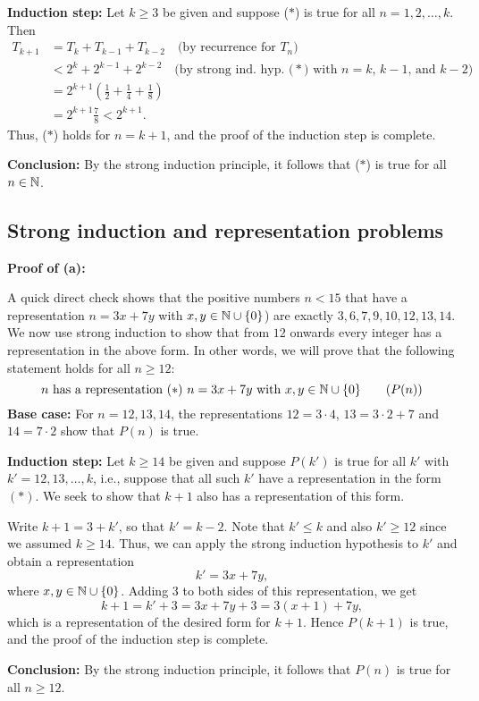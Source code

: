 \textbf{Induction step:} Let $k\ge3$ be given and suppose 
($*$) is true for all $n=1,2,\dots,k$. Then
\begin{align*}
T_{k+1}&=T_{k}+T_{k-1}+T_{k-2}
\quad \text{(by recurrence for $T_n$)}
\\
&<2^{k}+2^{k-1}+2^{k-2} \quad \text{(by strong ind. hyp. ($*$)
with $n=k$, $k-1$, and $k-2$)}
\\
&=2^{k+1}\left(\frac12+\frac14+\frac18\right)
\\
&=2^{k+1}\frac{7}{8}
<2^{k+1}.
\end{align*}
Thus, ($*$) holds for $n=k+1$, and the proof of the induction step is complete. 

\textbf{Conclusion:} By the strong induction principle,  it follows that
($*$) is true for all $n\in\mathbb{N}$.  

\subsection{Strong induction and representation problems}

\textbf{Proof of (a):}

A quick direct check shows that the 
positive numbers $n<15$ that have a
representation $n=3x+7y$ with $x,y\in\mathbb{N}\cup \{0\}$) are exactly
$3,6,7,9,10,12,13,14$.  We now use strong induction to show that from
$12$ onwards every integer has a representation in the above form.
In other words, we will prove that the following 
statement holds for all $n\ge12$:
\[
\text{$n$ has a representation $(*)$ $n=3x+7y$ with $x,y\in\mathbb{N}\cup \{0\}$}
\tag{$P(n)$}
\]
\textbf{Base case:} For $n=12,13,14$, the representations $12=3\cdot 4$,
$13=3\cdot 2+7$ and $14=7\cdot 2$ show that $P(n)$ is true.

\textbf{Induction step:} 
Let $k\ge14$ be given and suppose $P(k')$ is true for all $k'$ with 
$k'=12,13,\dots,k$, i.e., suppose that all such $k'$ have a representation in
the form $(*)$. We seek to show that $k+1$ also has a representation of
this form. 

Write  $k+1=3+k'$, so that $k'=k-2$. Note that $k'\le k$ and  also
$k'\ge 12$ since we assumed $k\ge14$. Thus, we can apply the strong
induction hypothesis to $k'$ and obtain a representation 
\[
k'=3x+7y,
\]
where $x,y\in\mathbb{N}\cup\{0\}$. Adding $3$ to both sides of this
representation, we get
\[
k+1=k'+3= 3x+7y+3=3(x+1)+7y,
\]
which is a representation of the desired form for $k+1$.
Hence $P(k+1)$ is true, and the proof of the induction step is complete.

\textbf{Conclusion:} By the strong induction principle, 
it follows that $P(n)$  is true for all $n\ge12$.

